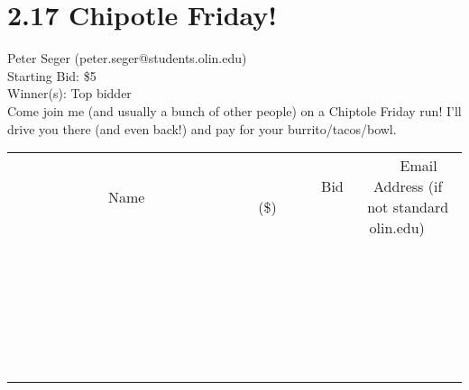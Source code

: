\documentclass[11pt]{article}
\begin{document}
\section*{2.17 Chipotle Friday!}
Peter Seger (peter.seger@students.olin.edu) \\
Starting Bid: \$5 \\
Winner(s): 
Top bidder \\
Come join me (and usually a bunch of other people) on a Chiptole Friday run! I'll drive you there (and even back!) and pay for your burrito/tacos/bowl. \\[6ex]
\begin{tabular}{c c c}
~~~~~~~~~~~~~Name~~~~~~~~~~~~~ & ~~~~~~~~~Bid (\$)~~~~~~~~~ & ~~~Email Address (if not standard olin.edu)~~~ \\
 & & \\
\hline
 & & \\
\hline
 & & \\
\hline
 & & \\
\hline
 & & \\
\hline
 & & \\
\hline
 & & \\
\hline
 & & \\
\hline
 & & \\
\hline
 & & \\
\hline
 & & \\
\hline
 & & \\
\hline
 & & \\
\hline
 & & \\
\hline
 & & \\
\hline
 & & \\
\hline
 & & \\
\hline
 & & \\
\hline
 & & \\
\hline
 & & \\
\hline
 & & \\
\hline
 & & \\
\hline
 & & \\
\hline
 & & \\
\hline
 & & \\
\hline
 & & \\
\hline
\end{tabular}
\clearpage
\end{document}
